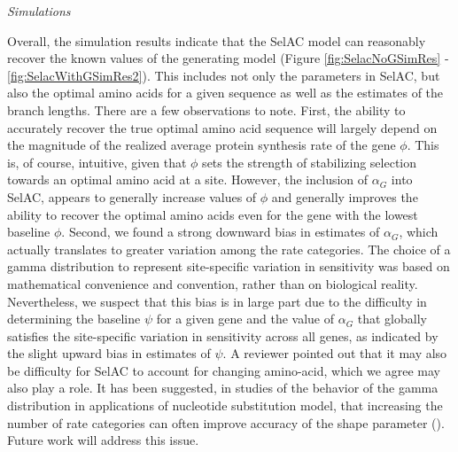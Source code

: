 \documentclass[12pt,letterpaper]{article}
\renewcommand{\subsection}[1]{%
\bigskip
\begin{center}
\begin{large}
\normalfont\itshape #1
\end{large}
\end{center}}
\newcommand{\selac}{SelAC\xspace}
\newcommand{\alphag}{\ensuremath{\alpha_G}\xspace}
\begin{document}
\subsection{Simulations}
Overall, the simulation results indicate that the SelAC model can reasonably recover the known values of the generating model (Figure \ref{fig:SelacNoGSimRes} - \ref{fig:SelacWithGSimRes2}).
This includes not only the parameters in \selac, but also the optimal amino acids for a given sequence as well as the estimates of the branch lengths.
There are a few observations to note.
First, the ability to accurately recover the true optimal amino acid sequence will largely depend on the magnitude of the realized average protein synthesis rate of the gene $\phi$.
This is, of course, intuitive, given that $\phi$ sets the strength of stabilizing selection towards an optimal amino acid at a site.
However, the inclusion of $\alphag$ into \selac, appears to generally increase values of $\phi$ and generally improves the ability to recover the optimal amino acids even for the gene with the lowest baseline $\phi$.
Second, we found a strong downward bias in estimates of $\alphag$, which actually translates to greater variation among the rate categories.
The choice of a gamma distribution to represent site-specific variation in sensitivity was based on mathematical convenience and convention, rather than on biological reality.
Nevertheless, we suspect that this bias is in large part due to the difficulty in determining the baseline $\psi$ for a given gene and the value of $\alphag$ that globally satisfies the site-specific variation in sensitivity across all genes, as indicated by the slight upward bias in estimates of $\psi$.
A reviewer pointed out that it may also be difficulty for \selac to account for changing amino-acid, which we agree may also play a role.
It has been suggested, in studies of the behavior of the gamma distribution in applications of nucleotide substitution model, that increasing the number of rate categories can often improve accuracy of the shape parameter (\citet{MayroseEtAl2005}).
Future work will address this issue.
\end{document}
